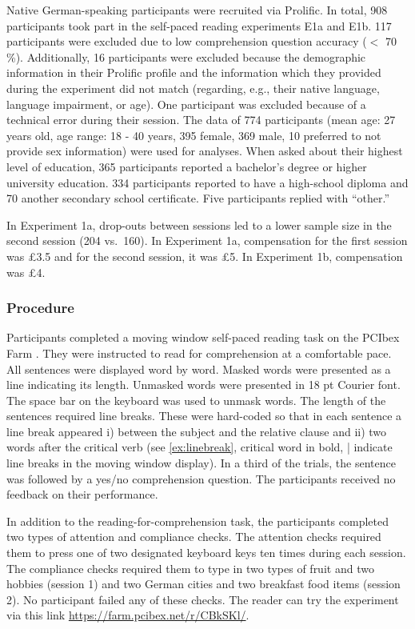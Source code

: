 \documentclass[review,preprint,12pt,authoryear,floatsintext]{elsarticle}
\begin{document}
Native German-speaking participants were recruited via Prolific. In total, 908 participants took part in the self-paced reading experiments E1a and E1b. 117 participants were excluded due to low comprehension question accuracy ($<$ 70\,\%). Additionally, 16 participants were excluded because the demographic information in their Prolific profile and the information which they provided during the experiment did not match (regarding, e.g., their native language, language impairment, or age). One participant was excluded because of a technical error during their session. The data of 774 participants (mean age: 27 years old, age range: 18 - 40 years, 395 female, 369 male, 10 preferred to not provide sex information) were used for analyses. When asked about their highest level of education, 365 participants reported a bachelor's degree or higher university education. 334 participants reported to have a high-school diploma and 70 another secondary school certificate. Five participants replied with ``other.'' 

In Experiment 1a, drop-outs between sessions led to a lower sample size in the second session (204 vs.\ 160). In Experiment 1a, compensation for the first session was \pounds 3.5 and for the second session, it was \pounds 5. In Experiment 1b, compensation was \pounds 4. 

\subsubsection{Procedure}
Participants completed a moving window self-paced reading task \citep{just_etal_1982} on the PCIbex Farm \citep{pcibex}. They were instructed to read for comprehension at a comfortable pace. All sentences were displayed word by word. Masked words were presented as a line indicating its length. Unmasked words were presented in 18 pt Courier font. The space bar on the keyboard was used to unmask words. The length of the sentences required line breaks. These were hard-coded so that in each sentence a line break appeared i) between the subject and the relative clause and ii) two words after the critical verb (see \ref{ex:linebreak}, critical word in bold, | indicate line breaks in the moving window display). In a third of the trials, the sentence was followed by a yes/no comprehension question. The participants received no feedback on their performance.

In addition to the reading-for-comprehension task, the participants completed two types of attention and compliance checks. The attention checks required them to press one of two designated keyboard keys ten times during each session. The compliance checks required them to type in two types of fruit and two hobbies (session 1) and two German cities and two breakfast food items (session 2). No participant failed any of these checks. The reader can try the experiment via this link \hyperlink{https://farm.pcibex.net/r/CBkSKl/}{https://farm.pcibex.net/r/CBkSKl/}. 
\end{document}
